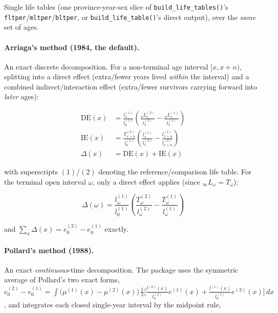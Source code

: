 \documentclass[11pt]{article}
\newcommand{\fn}[1]{\texttt{#1}}
\begin{document}
\begin{description}[leftmargin=2.2cm,style=nextline]
  \item[lt1, lt2] Single life tables (one province-year-sex slice of
    \fn{build\_life\_tables()}'s \fn{fltper}/\fn{mltper}/\fn{bltper}, or
    \fn{build\_life\_table()}'s direct output), over the \emph{same} set of
    ages.
\end{description}

\paragraph{Arriaga's method (1984, the default).} An exact discrete
decomposition. For a non-terminal age interval $[x, x+n)$, splitting into a
direct effect (extra/fewer years lived \emph{within} the interval) and a
combined indirect/interaction effect (extra/fewer survivors carrying
forward into \emph{later} ages):

\begin{align}
\mathrm{DE}(x) &= \frac{l_x^{(1)}}{l_0^{(1)}}
  \left(\frac{{}_nL_x^{(2)}}{l_x^{(2)}} - \frac{{}_nL_x^{(1)}}{l_x^{(1)}}\right) \\
\mathrm{IE}(x) &= \frac{T_{x+n}^{(2)}}{l_0^{(1)}}
  \left(\frac{l_x^{(1)}}{l_x^{(2)}} - \frac{l_{x+n}^{(1)}}{l_{x+n}^{(2)}}\right) \\
\Delta(x) &= \mathrm{DE}(x) + \mathrm{IE}(x)
\end{align}

with superscripts $(1)$/$(2)$ denoting the reference/comparison life table.
For the terminal open interval $\omega$, only a direct effect applies (since
${}_{\infty}L_\omega = T_\omega$):

\begin{equation}
\Delta(\omega) = \frac{l_\omega^{(1)}}{l_0^{(1)}}
  \left(\frac{T_\omega^{(2)}}{l_\omega^{(2)}} - \frac{T_\omega^{(1)}}{l_\omega^{(1)}}\right)
\end{equation}

and $\sum_x \Delta(x) = e_0^{(2)} - e_0^{(1)}$ exactly.

\paragraph{Pollard's method (1988).} An exact \emph{continuous}-time
decomposition. The package uses the symmetric average of Pollard's two exact
forms,
$e_0^{(2)} - e_0^{(1)} = \int \bigl(\mu^{(1)}(x) - \mu^{(2)}(x)\bigr)\,
\tfrac12\bigl[\tfrac{l^{(2)}(x)}{l_0^{(2)}} e^{(1)}(x) + \tfrac{l^{(1)}(x)}{l_0^{(1)}} e^{(2)}(x)\bigr]\,dx$,
and integrates each closed single-year interval by the midpoint rule,
\end{document}
